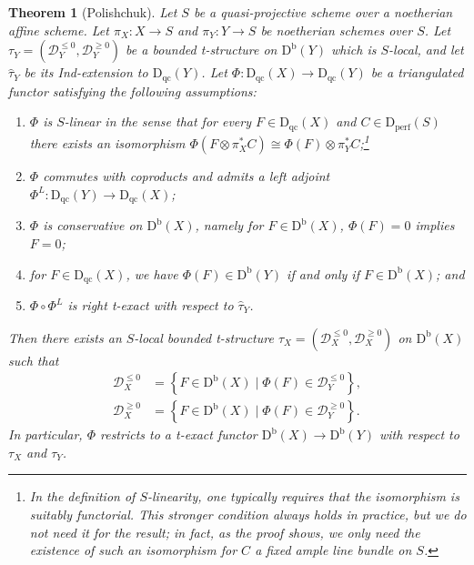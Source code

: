 \documentclass[11pt, reqno]{amsart}
\numberwithin{equation}{section}
\theoremstyle{plain}
\newtheorem{theorem}{Theorem}[section]
\theoremstyle{remark}
\theoremstyle{definition}
\theoremstyle{italicsname}
\newcommand{\st}{\mid}
\newcommand{\Db}{\mathrm{D^b}}
\newcommand{\Dperf}{\mathrm{D}_{\mathrm{perf}}}
\newcommand{\Dqc}{\mathrm{D}_{\mathrm{qc}}}
\newcommand{\cD}{\mathscr{D}}
\begin{document}
\begin{theorem}[Polishchuk]\label{thm:Polishchuk}
Let $S$ be a quasi-projective scheme over a noetherian affine scheme.
Let $\pi_X \colon X \to S$ and $\pi_Y \colon Y \to S$ be noetherian schemes over $S$. 
Let $\tau_Y=(\cD_Y^{\leqslant0},\cD_Y^{\geqslant0})$ be a bounded t-structure on $\Db(Y)$ which is $S$-local, and let  $\widehat{\tau}_Y$ be its Ind-extension to $\Dqc(Y)$.
Let $\Phi\colon\Dqc(X)\to\Dqc(Y)$ be a triangulated functor satisfying the following assumptions: 
\begin{enumerate}[{\rm (i)}]
    \item \label{enum:Polishchuk0} $\Phi$ is $S$-linear in the sense that for every $F\in\Dqc(X)$ and $C\in\Dperf(S)$ there exists an isomorphism $\Phi(F\otimes \pi_X^*C)\cong\Phi(F)\otimes \pi_Y^*C$;\footnote{In the definition of $S$-linearity, one typically requires that the isomorphism is suitably functorial. This stronger condition always holds in practice, but we do not need it for the result; in fact, as the proof shows, we only need the existence of such an isomorphism for $C$ a fixed ample line bundle on $S$.}
    \item\label{enum:Polishchuk1} $\Phi$ commutes with coproducts and admits a left adjoint $\Phi^L\colon\Dqc(Y)\to\Dqc(X)$;
    \item\label{enum:Polishchuk2} $\Phi$ is conservative on $\Db(X)$, namely for $F\in\Db(X)$, $\Phi(F)=0$ implies $F=0$;
    \item\label{enum:Polishchuk3} for $F\in\Dqc(X)$, we have $\Phi(F)\in\Db(Y)$ if and only if $F\in\Db(X)$; and 
    \item\label{enum:Polishchuk4} $\Phi\circ\Phi^L$ is right t-exact with respect to $\widehat{\tau}_Y$. 
\end{enumerate}
Then there exists an $S$-local bounded t-structure $\tau_X=(\cD_X^{\leqslant0},\cD_X^{\geqslant0})$ on $\Db(X)$ such that
\begin{align}
\label{eq:Polishchuk-leq} \cD_X^{\leqslant0} & =\left\{F\in\Db(X)\st \Phi(F)\in\cD_Y^{\leqslant0}\right\} ,\\ 
\label{eq:Polishchuk-geq} \cD_X^{\geqslant0} & =\left\{F\in\Db(X)\st \Phi(F)\in\cD_Y^{\geqslant0}\right\}.
\end{align} 
In particular, $\Phi$ restricts to a t-exact functor $\Db(X) \to \Db(Y)$ with respect to $\tau_X$ and $\tau_Y$.
\end{theorem}
\end{document}
